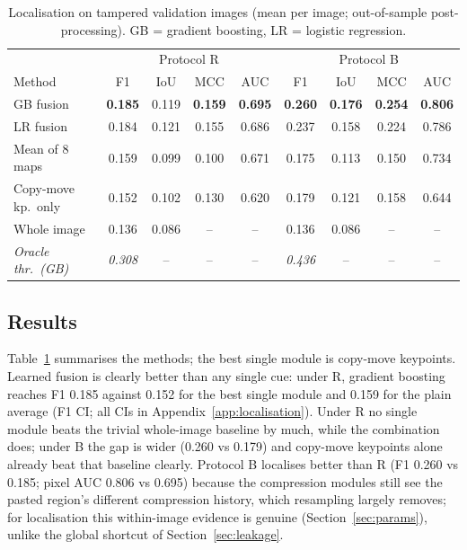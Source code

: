 \begin{table}[!t]
\centering
\caption{Localisation on tampered validation images (mean per image; out-of-sample post-processing). GB = gradient boosting, LR = logistic regression.}
\label{tab:loc-methods}
\scriptsize
\setlength{\tabcolsep}{2.5pt}
\begin{tabular}{lcccccccc}
\toprule
 & \multicolumn{4}{c}{Protocol R} & \multicolumn{4}{c}{Protocol B} \\
Method & F1 & IoU & MCC & AUC & F1 & IoU & MCC & AUC \\
\midrule
GB fusion & \textbf{0.185} & 0.119 & \textbf{0.159} & \textbf{0.695} & \textbf{0.260} & \textbf{0.176} & \textbf{0.254} & \textbf{0.806} \\
LR fusion & 0.184 & 0.121 & 0.155 & 0.686 & 0.237 & 0.158 & 0.224 & 0.786 \\
Mean of 8 maps & 0.159 & 0.099 & 0.100 & 0.671 & 0.175 & 0.113 & 0.150 & 0.734 \\
Copy-move kp.\ only & 0.152 & 0.102 & 0.130 & 0.620 & 0.179 & 0.121 & 0.158 & 0.644 \\
Whole image & 0.136 & 0.086 & -- & -- & 0.136 & 0.086 & -- & -- \\
\emph{Oracle thr.\ (GB)} & \emph{0.308} & -- & -- & -- & \emph{0.436} & -- & -- & -- \\
\bottomrule
\end{tabular}
\end{table}

\subsection{Results}\label{sec:localisation-results}
Table~\ref{tab:loc-methods} summarises the methods; the best single module is copy-move keypoints. Learned fusion is clearly better than any single cue: under R, gradient boosting reaches F1 0.185 against 0.152 for the best single module and 0.159 for the plain average (F1 CI; all CIs in Appendix~\ref{app:localisation}). Under R no single module beats the trivial whole-image baseline by much, while the combination does; under B the gap is wider (0.260 vs 0.179) and copy-move keypoints alone already beat that baseline clearly. Protocol B localises better than R (F1 0.260 vs 0.185; pixel AUC 0.806 vs 0.695) because the compression modules still see the pasted region's different compression history, which resampling largely removes; for localisation this within-image evidence is genuine (Section~\ref{sec:params}), unlike the global shortcut of Section~\ref{sec:leakage}.

